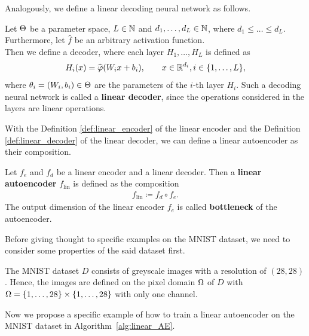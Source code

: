 Analogously, we define a linear decoding neural network as follows.

\begin{definition}\label{def:linear_decoder}
Let $\operatorname{\Theta}$ be a parameter space, $L\in \operatorname{\mathbb{N}}$ and $d_1,\ldots,d_L \in \operatorname{\mathbb{N}}$, where $d_1\leq \ldots \leq d_L$. Furthermore, let $\hat{f}$ be an arbitrary activation function.\\
Then we define a decoder, where each layer $H_1,\ldots, H_L$ is defined as
\begin{align*}
H_i(x) = \widehat{\operatorname{\varphi}}(W_ix + b_i), \qquad x \in \operatorname{\mathbb{R}}^{d_i}, i \in \{1,\ldots, L\},
\end{align*}
where $\theta_i=(W_i, b_i)\in\operatorname{\Theta}$ are the parameters of the $i$-th layer $H_i$. Such a decoding neural network is called a \textbf{linear decoder}, since the operations considered in the layers are linear operations.
\end{definition}

With the Definition \ref{def:linear_encoder} of the linear encoder and the Definition \ref{def:linear_decoder} of the linear decoder, we can define a linear autoencoder as their composition.

\begin{definition}
Let $f_e$ and $f_d$ be a linear encoder and a linear decoder. Then a \textbf{linear autoencoder} $f_{\text{lin}}$ is defined as the composition
\begin{align*}
f_{\text{lin}} \coloneqq f_d \circ f_e.
\end{align*}
The output dimension of the linear encoder $f_e$ is called \textbf{bottleneck} of the autoencoder.
\end{definition}

Before giving thought to specific examples on the MNIST dataset, we need to consider some properties of the said dataset first.

\begin{remark}\label{remark:mnist}
The MNIST dataset $D$ consists of greyscale images with a resolution of $(28,28)$. Hence, the images are defined on the pixel domain $\Omega$ of $D$ with $\Omega=\{1,\ldots,28\}\times\{1,\ldots,28\}$ with only one channel.
\end{remark}

Now we propose a specific example of how to train a linear autoencoder on the MNIST dataset in Algorithm~\ref{alg:linear_AE}.

